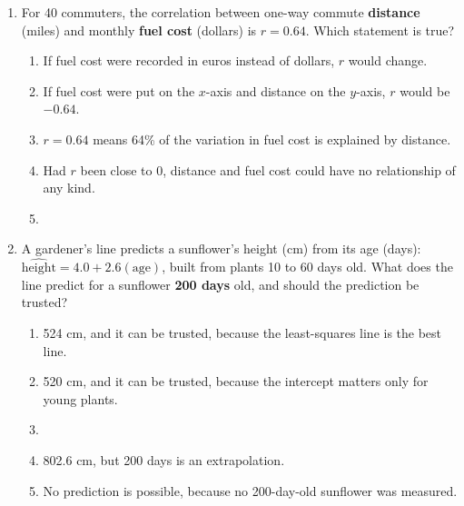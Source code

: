 \documentclass[12pt]{article}
\begin{document}
\begin{enumerate}[leftmargin=1.9em, itemsep=0.13in]
  \boxguard[10]
  \item For 40 commuters, the correlation between one-way commute \textbf{distance} (miles) and
        monthly \textbf{fuel cost} (dollars) is $r = 0.64$. Which statement is true?
        \begin{enumerate}[label=\textbf{(\Alph*)}, leftmargin=2.2em, itemsep=2pt]
          \item If fuel cost were recorded in euros instead of dollars, $r$ would change.
          \item If fuel cost were put on the $x$-axis and distance on the $y$-axis, $r$ would be
                $-0.64$.
          \item $r = 0.64$ means 64\% of the variation in fuel cost is explained by distance.\hfill{}\rule[-0.2in]{0pt}{0.48in}
          \item Had $r$ been close to 0, distance and fuel cost could have no relationship of
                any kind.
          \item {}
        \end{enumerate}

  \boxguard[8]
  \item A gardener's line predicts a sunflower's height (cm) from its age (days):
        $\widehat{\text{height}} = 4.0 + 2.6(\text{age})$, built from plants 10 to 60 days old.
        What does the line predict for a sunflower \textbf{200 days} old, and should the
        prediction be trusted?
        \begin{enumerate}[label=\textbf{(\Alph*)}, leftmargin=2.2em, itemsep=2pt]
          \item 524 cm, and it can be trusted, because the least-squares line is the best line.
          \item 520 cm, and it can be trusted, because the intercept matters only for young
                plants.
          \item {}
          \item 802.6 cm, but 200 days is an extrapolation.
          \item No prediction is possible, because no 200-day-old sunflower was measured.\hfill{}\rule[-0.2in]{0pt}{0.48in}
        \end{enumerate}


\end{enumerate}
\end{document}
